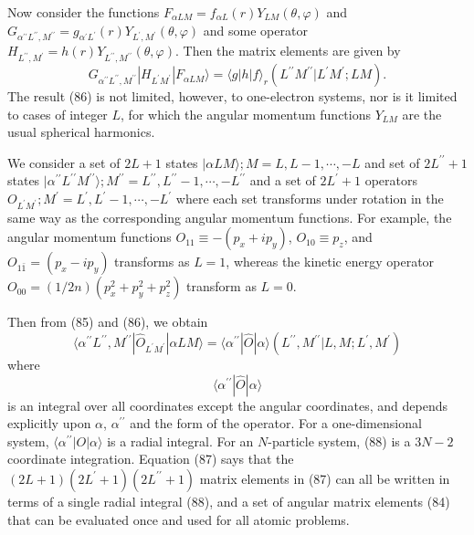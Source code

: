 Now consider the functions $F_{\alpha LM} = f_{\alpha L} ( r ) 
Y_{LM} ( \theta , \varphi )$ and $G_{\alpha^{\prime \prime}
L^{\prime \prime} , M^{\prime \prime}} = 
g_{\alpha^{\prime}L^{\prime}}(r) Y_{L^{\prime} , M^{\prime}}(\theta , 
\varphi)$ and some operator $H_{L^{\prime \prime} , M^{\prime}} = 
h(r) Y_{L^{\prime \prime} , M^{\prime \prime}} ( \theta , \varphi )$.  
Then the matrix elements are given by
\begin{equation}
G_{\alpha^{\prime \prime} L^{\prime \prime} , M^{\prime \prime}} | 
H_{L^{\prime}M^{\prime}} | F_{\alpha LM} \rangle = \langle g | h | f 
\rangle_r \left( L^{\prime \prime} M^{\prime \prime}  | 
L^{\prime}M^{\prime} ; LM \right).
\label{chap16-eqno86}
\end{equation}
The result (86) is not limited, however, to one-electron systems, nor 
is it limited to cases of integer $L$, for which the angular momentum 
functions $Y_{LM}$ are the usual spherical harmonics.

We consider a set of $2L+1$ states $| \alpha LM \rangle ; M = L , L - 
1 , \cdots , -L$ and set of $2 L^{\prime \prime} +1$ states $| 
\alpha^{\prime \prime} L^{\prime \prime} M^{\prime \prime} \rangle ; 
M^{\prime \prime} = L^{\prime \prime} ,
L^{\prime \prime} - 1 , \cdots , -L^{\prime \prime}$ and a set of 
$2L^{\prime} + 1$ operators $O_{L^{\prime}M^{\prime}} ; M^{\prime} = 
L^{\prime} , L^{\prime} - 1 , \cdots , -L^{\prime}$ where each set 
transforms under rotation in the same way as the corresponding 
angular momentum functions.  For example, the angular momentum 
functions $O_{11} \equiv -(p_x + ip_y)$, $O_{10} \equiv p_z$, and 
$O_{1{\bar{1}}} = (p_x - ip_y)$ transforms as $L = 1$, whereas the 
kinetic energy operator $O_{00} = (1/2n) (p^2_x + p^2_y + p^2_z)$ 
transform as $L = 0$.  

Then from (85) and (86), we obtain
\begin{equation}
\langle \alpha^{\prime \prime} L^{\prime \prime} , M^{\prime 
\prime} | {\hat{O}}_{L^{\prime}M^{\prime}} | \alpha LM \rangle = 
\langle \alpha^{\prime \prime} | {\hat{O}} | \alpha \rangle \left( 
L^{\prime \prime} , M^{\prime \prime} | L , M ; L^{\prime} , 
M^{\prime} \right)
\label{chap16-eqno87}
\end{equation}
where
\begin{equation}
\langle \alpha^{\prime \prime} | {\hat{O}} | \alpha \rangle
\label{chap16-eqno88}
\end{equation}
is an integral over all coordinates except the angular coordinates, 
and depends explicitly upon $\alpha$, $\alpha^{\prime \prime}$ and 
the form of the operator.  For a one-dimensional system, 
$\langle \alpha^{\prime \prime} | O | \alpha \rangle$ is a radial 
integral. For an $N$-particle system, (88) is a $3N-2$ coordinate 
integration.  Equation (87) says that the $(2L+1)(2L^{\prime} + 
1)(2L^{\prime \prime}+1)$ matrix elements in (87) can all be written 
in terms of a single radial integral (88), and a set of angular 
matrix elements (84) that can be evaluated once and used for all 
atomic problems.

